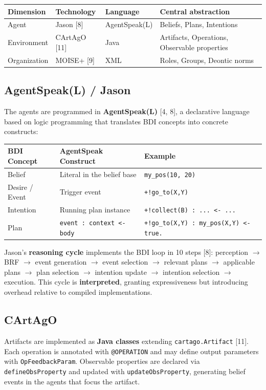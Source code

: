 \documentclass[11pt,a4paper]{article}
\newcommand{\code}[1]{\texttt{#1}}
\begin{document}
\begin{table}[H]
\centering
\begin{tabularx}{\linewidth}{l l l X}
\toprule
\textbf{Dimension} & \textbf{Technology} & \textbf{Language} & \textbf{Central abstraction} \\
\midrule
Agent & Jason [8] & AgentSpeak(L) & Beliefs, Plans, Intentions \\
Environment & CArtAgO [11] & Java & Artifacts, Operations, Observable properties \\
Organization & MOISE+ [9] & XML & Roles, Groups, Deontic norms \\
\bottomrule
\end{tabularx}
\end{table}

\subsection{AgentSpeak(L) / Jason}
The agents are programmed in \textbf{AgentSpeak(L)} [4, 8], a declarative language based on logic programming that translates BDI concepts into concrete constructs:

\begin{table}[H]
\centering
\footnotesize
\begin{tabularx}{\linewidth}{l X X}
\toprule
\textbf{BDI Concept} & \textbf{AgentSpeak Construct} & \textbf{Example} \\
\midrule
Belief & Literal in the belief base & \code{my\_pos(10, 20)} \\
Desire / Event & Trigger event & \code{+!go\_to(X,Y)} \\
Intention & Running plan instance & \code{+!collect(B) : ... <- ...} \\
Plan & \code{event : context <- body} & \code{+!go\_to(X,Y) : my\_pos(X,Y) <- true.} \\
\bottomrule
\end{tabularx}
\end{table}

Jason's \textbf{reasoning cycle} implements the BDI loop in 10 steps [8]: perception $\rightarrow$ BRF $\rightarrow$ event generation $\rightarrow$ event selection $\rightarrow$ relevant plans $\rightarrow$ applicable plans $\rightarrow$ plan selection $\rightarrow$ intention update $\rightarrow$ intention selection $\rightarrow$ execution. This cycle is \textbf{interpreted}, granting expressiveness but introducing overhead relative to compiled implementations.

\subsection{CArtAgO}
Artifacts are implemented as \textbf{Java classes} extending \code{cartago.Artifact} [11]. Each operation is annotated with \code{@OPERATION} and may define output parameters with \code{OpFeedbackParam}. Observable properties are declared via \code{defineObsProperty} and updated with \code{updateObsProperty}, generating belief events in the agents that focus the artifact.
\end{document}
